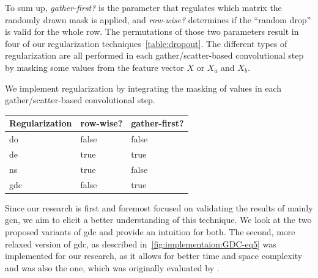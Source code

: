 To sum up, \textit{gather-first?} is the parameter that regulates which matrix the randomly drawn mask is applied, and \textit{row-wise?} determines if the ``random drop'' is valid for the whole row. The permutations of those two parameters result in four of our regularization techniques~\cref{table:dropout}.
The different types of regularization are all performed in each gather/scatter-based convolutional step by masking some values from the feature vector $X$ or $X_a$ and $X_b$.


We implement regularization by integrating the masking of values in each gather/scatter-based convolutional step.
\begin{center}
    \begin{tabular}{lll}
        \toprule
        \textbf{Regularization} & \textbf{row-wise?} & \textbf{gather-first?} \\
        \midrule
        \acf{do}                & false              & false                  \\
        \acf{de}                & true               & true                   \\
        \acf{ns}                & true               & false                  \\
        \acf{gdc}               & false              & true                   \\

        \bottomrule
    \end{tabular}
    \label{table:dropout}
\end{center}

Since our research is first and foremost focused on validating the results of mainly \ac{gcn}, we aim to elicit a better understanding of this technique.
We look at the two proposed variants of \ac{gdc} and provide an intuition for both.
The second, more relaxed version of \ac{gdc}, as described in~\cref{fig:implementaion:GDC-eq5} was implemented for our research, as it allows for better time and space complexity and was also the one, which was originally evaluated by \citep{Hasanzadeh2020}.

